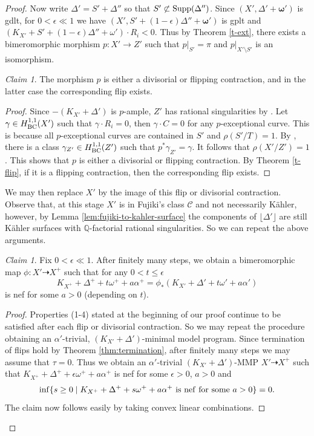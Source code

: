 \documentclass[12pt]{amsart}
\theoremstyle{plain}
\theoremstyle{remark}
\theoremstyle{definition}
\newcommand{\<}{\leq}
\newcommand{\mbQ}{\mathbb{Q}}
\newcommand{\Supp}{{\rm Supp}}
\def\lrd{\lfloor}
\def\rrd{\rfloor}
\def\mcC{\mathcal{C}}
\def\eps{\epsilon}
\def\lrd{\lfloor}
\def\rrd{\rfloor}
\def\bomega{\boldsymbol{\omega}}
\theoremstyle{definition}
\theoremstyle{definition}
\numberwithin{equation}{section}
\theoremstyle{remark}
\newtheorem{claim}[theorem]{Claim}
\begin{document}
\begin{proof}
Now write $\Delta'=S'+\Delta''$ so that $S'\not\subset \Supp(\Delta'')$. Since $(X', \Delta'+\bomega')$ is gdlt, for $0<\eps\ll 1$ we have $(X', S'+(1-\eps)\Delta''+\bomega')$ is gplt and $(K_{X'}+S'+(1-\eps)\Delta''+\omega')\cdot R_i<0$. Thus by Theorem \ref{t-ext}, there exists 
a bimeromorphic morphism $p : X' \to Z'$ such that $p|_{S'} = \pi$ and $p|_{X'\setminus S'}$ is an isomorphism.
\begin{claim}\label{clm:contraction}
   The morphism $p$ is either a divisorial or flipping contraction, and in the latter case the corresponding flip exists. 
\end{claim}
\begin{proof}
    Since $-(K_{X'}+\Delta ')$ is $p$-ample, $Z'$ has rational singularities by \cite[Lemma 2.41]{DH20}. Let $\gamma \in H^{1,1}_{\rm BC}(X')$ such that $\gamma \cdot R_i=0$, then $\gamma \cdot C=0$ for any $p$-exceptional curve. This is because all $p$-exceptional curves are contained in $S'$ and $\rho (S'/T)=1$.
    By \cite[Lemma 3.3]{HP16}, there is a class $\gamma _{Z'}\in H^{1,1}_{\rm BC}(Z')$ such that $p^*\gamma _{Z'}=\gamma$. It follows that $\rho (X'/Z')=1$.
    This shows that 
 $p$ is either a divisorial or flipping contraction. By Theorem \ref{t-flip}, if it is a flipping contraction, then the corresponding flip exists. 
 \end{proof}

We may then replace $X'$ by the image of this flip or divisorial contraction. Observe that, at this stage $X'$ is in Fujiki's class $\mcC$ and not necessarily K\"ahler, however, by Lemma \ref{lem:fujiki-to-kahler-surface} the components of $\lrd\Delta'\rrd$ are still K\"ahler surfaces with $\mbQ$-factorial rational singularities. So we can repeat the above arguments. 


\begin{claim}\label{c-m} Fix $0<\epsilon  \ll 1$. After finitely many steps, we obtain a bimeromorphic map $\phi: X'\dasharrow X^+$ such that for any $0<t\leq \epsilon$ \[K_{X^+}+\Delta ^++t\omega ^+ +a\alpha ^+=\phi _*(K_{X'}+\Delta'+t\omega'+a\alpha ')\] is nef for some $a>0$ (depending on $t$).
\end{claim} 
\begin{proof}
    Properties (1-4) stated at the beginning of our proof continue to be satisfied after each flip or divisorial contraction. So we may repeat the procedure obtaining an $\alpha '$-trivial, $(K_{X'}+\Delta ')$-minimal model program. Since 
    termination of flips hold by Theorem \ref{thm:termination}, after finitely many steps we may assume that $\tau=0$. Thus we obtain an $\alpha '$-trivial $(K_{X'}+\Delta ')$-MMP $X'\dasharrow X^+$ such that $K_{X^+}+\Delta ^++\epsilon \omega ^++a\alpha ^+$ is nef for some $\epsilon >0$, $a>0$ 
    and \[{\rm inf}\{ s\geq 0\;|\; K_{X^+}+\Delta ^++s\omega^++a\alpha^+\ {\rm is\ nef\ for\ some\ }a>0\}=0.\]
   The claim now follows easily by taking convex linear combinations. 
\end{proof}



\end{proof}
\end{document}
